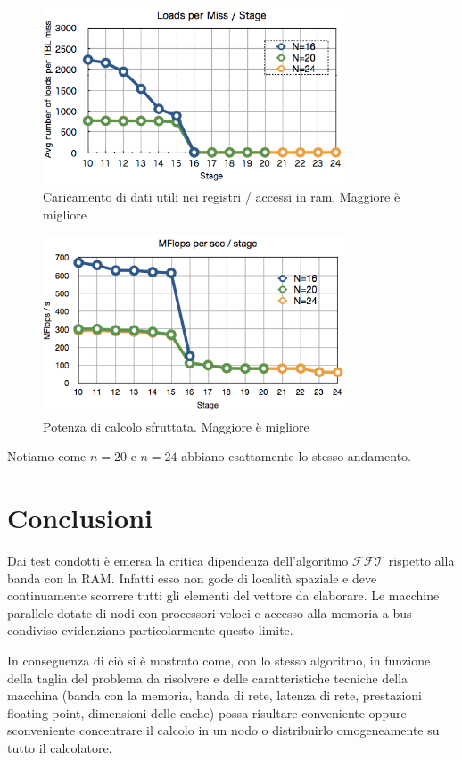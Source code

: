 \documentclass[12pt,a4paper,oneside,openright]{article}
\begin{document}
\begin{figure}[h!]
  \centering
      \includegraphics[width=0.8\textwidth]{immagini/Miss}
  \caption{Caricamento di dati utili nei registri / accessi in ram. Maggiore è migliore}
\label{Miss}
\end{figure}

\begin{figure}[h!] 
  \centering
      \includegraphics[width=0.8\textwidth]{immagini/Mflops}
  \caption{Potenza di calcolo sfruttata. Maggiore è migliore}
\label{MFlops}
\end{figure}
Notiamo come $n=20$ e $n=24$ abbiano esattamente lo stesso andamento.

\section*{Conclusioni}

Dai test condotti è emersa la critica dipendenza dell'algoritmo $\mathcal{FFT}$ rispetto alla banda con la RAM. Infatti esso non gode di località spaziale e deve continuamente scorrere tutti gli elementi del vettore da elaborare. Le macchine parallele dotate di nodi con processori veloci e accesso alla memoria a bus condiviso evidenziano particolarmente questo limite.

In conseguenza di ciò si è mostrato come, con lo stesso algoritmo, in funzione della taglia del problema da risolvere e delle caratteristiche tecniche della macchina (banda con la memoria, banda di rete, latenza di rete, prestazioni floating point, dimensioni delle cache) possa risultare conveniente oppure sconveniente concentrare il calcolo in un nodo o distribuirlo omogeneamente su tutto il calcolatore.
\end{document}
